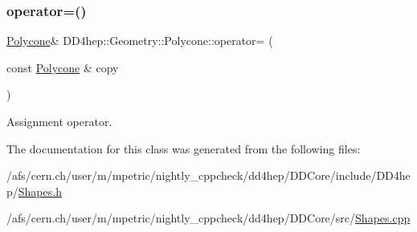\subsubsection{\texorpdfstring{operator=()}{operator=()}}
{\footnotesize\ttfamily \hyperlink{class_d_d4hep_1_1_geometry_1_1_polycone}{Polycone}\& D\+D4hep\+::\+Geometry\+::\+Polycone\+::operator= (\begin{DoxyParamCaption}\item[{const \hyperlink{class_d_d4hep_1_1_geometry_1_1_polycone}{Polycone} \&}]{copy }\end{DoxyParamCaption})\hspace{0.3cm}{\ttfamily [default]}}



Assignment operator. 



The documentation for this class was generated from the following files\+:\begin{DoxyCompactItemize}
\item 
/afs/cern.\+ch/user/m/mpetric/nightly\+\_\+cppcheck/dd4hep/\+D\+D\+Core/include/\+D\+D4hep/\hyperlink{_shapes_8h}{Shapes.\+h}\item 
/afs/cern.\+ch/user/m/mpetric/nightly\+\_\+cppcheck/dd4hep/\+D\+D\+Core/src/\hyperlink{_shapes_8cpp}{Shapes.\+cpp}\end{DoxyCompactItemize}
